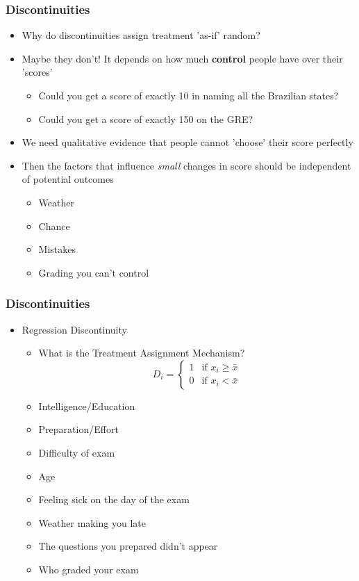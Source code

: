 \documentclass[xcolor=x11names,compress]{beamer}\usepackage[]{graphicx}\usepackage[]{color}
\renewcommand{\(}{\begin{columns}}
\renewcommand{\)}{\end{columns}}
\newcommand{\<}[1]{\begin{column}{#1}}
\renewcommand{\>}{\end{column}}
\begin{document}
\begin{frame}
\frametitle{Discontinuities}
\begin{itemize}
\item Why do discontinuities assign treatment 'as-if' random?
\pause
\item Maybe they don't! \pause It depends on how much \textbf{control} people have over their 'scores'
\pause
\begin{itemize}
\item Could you get a score of exactly 10 in naming all the Brazilian states?
\pause
\item Could you get a score of exactly 150 on the GRE?
\end{itemize}
\pause
\item We need qualitative evidence that people cannot 'choose' their score perfectly
\pause
\item Then the factors that influence \textit{small} changes in score should be independent of potential outcomes
\pause
\begin{itemize}
\item Weather
\item Chance
\item Mistakes
\item Grading you can't control
\end{itemize}
\end{itemize}
\end{frame}

\begin{frame}
\frametitle{Discontinuities}
\begin{itemize}
\item Regression Discontinuity
\begin{itemize}
\item What is the Treatment Assignment Mechanism?
\pause
\[
D_i=
\begin{cases}
1 & \text{if }x_i \geq \bar{x} \\
0 & \text{if }x_i < \bar{x}
\end{cases}
\]
\pause
\item Intelligence/Education
\item Preparation/Effort
\item Difficulty of exam
\item Age
\pause
\item Feeling sick on the day of the exam
\item Weather making you late
\item The questions you prepared didn't appear
\item Who graded your exam
\end{itemize}
\end{itemize}
\end{frame}
\end{document}
